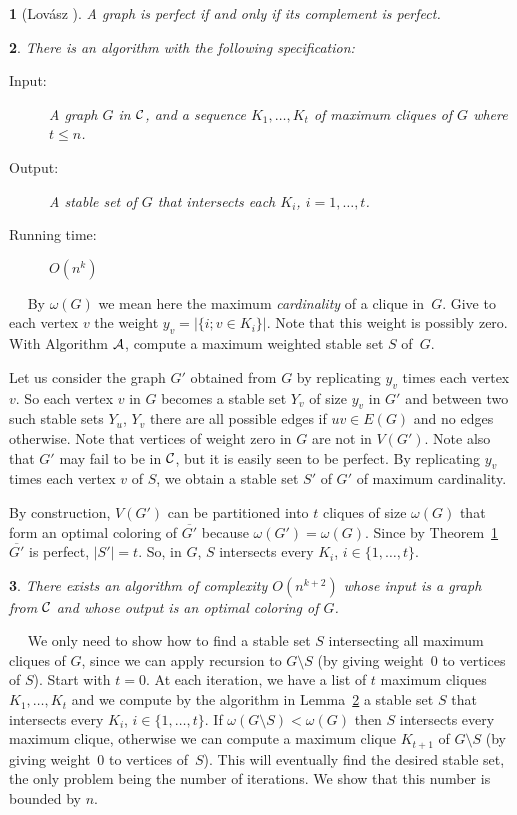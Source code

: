 \documentclass[11 pt] {article}
\newcommand\blackslug{\hbox{\hskip 1pt \vrule width 4pt height 8pt depth 1.5pt
        \hskip 1pt}}
\newcommand\bbox{\hfill \quad \blackslug \medbreak}
\newtheorem{theorem}{}[section]
\newtheorem{lemma}[theorem]{}
\newcounter{claim}
\newcommand{\Proof}{\setcounter{claim}{0}\noindent{\bf Proof.}\ \ }
\begin{document}
\begin{theorem}[Lov\'asz \cite{lovasz:nh}]
  \label{th:lovasz}
  A graph is perfect if and only if its complement is perfect.
\end{theorem}

\begin{lemma}
  \label{l:compS}
  There is an algorithm with the following specification:
  \begin{description}
  \item[Input: ] A graph $G$ in ${\cal C}$, and a sequence
    $K_1, \dots, K_t$ of maximum cliques of $G$ where $t\leq n$.
  \item[Output: ] A stable set of $G$ that intersects each $K_i$,
    $i=1, \dots, t$. 
  \item[Running time: ] ${O}(n^k)$
  \end{description} 
\end{lemma}

\Proof
  By $\omega(G)$ we mean here the maximum \emph{cardinality} of a
  clique in~$G$.  Give to each vertex $v$ the weight $y_v= |\{ i; v
  \in K_i \}|$.  Note that this weight is possibly zero.  With
  Algorithm ${\cal A}$, compute a maximum weighted stable set $S$ of~$G$.

  Let us consider the graph $G'$ obtained from $G$ by replicating
  $y_v$ times each vertex $v$. So each vertex $v$ in $G$ becomes a
  stable set $Y_v$ of size $y_v$ in $G'$ and between two such stable sets
  $Y_u$, $Y_v$ there are all possible edges if $uv\in E(G)$ and
  no edges otherwise. Note that vertices of weight zero in $G$
  are not in $V(G')$. Note also that $G'$ may fail to be in ${\cal C}$,
  but it is easily seen to be perfect.  By replicating $y_v$ times
  each vertex $v$ of $S$, we obtain a stable set $S'$ of $G'$ of
  maximum cardinality.

  By construction, $V(G')$ can be partitioned into $t$ cliques of size
  $\omega (G)$ that form an optimal coloring of $\overline{G'}$
  because $\omega(G') = \omega(G)$.  Since by Theorem~\ref{th:lovasz}
  $\overline{G'}$ is perfect, $|S'|=t$.  So, in $G$, $S$ intersects
  every $K_i$, $i \in \{ 1, \ldots ,t\}$.
\bbox


\begin{theorem}
  \label{th:color}
  There exists an algorithm of complexity $O(n^{k+2})$ whose input is
  a graph from ${\cal C}$ and whose output is an optimal coloring of $G$.
\end{theorem}

\Proof
  We only need to show how to find a stable set $S$ intersecting all
  maximum cliques of $G$, since we can apply recursion to $G \setminus
  S$ (by giving weight~0 to vertices of $S$).  Start with $t=0$. At
  each iteration, we have a list of $t$ maximum cliques $K_1, \ldots,
  K_t$ and we compute by the algorithm in Lemma~\ref{l:compS} a stable
  set $S$ that intersects every $K_i$, $i \in \{ 1, \ldots ,t \}$.  If
  $\omega (G \setminus S) < \omega (G)$ then $S$ intersects every
  maximum clique, otherwise we can compute a maximum clique $K_{t+1}$
  of $G \setminus S$ (by giving weight~0 to vertices of~$S$).  This
  will eventually find the desired stable set, the only problem being the
  number of iterations.  We show that this number is bounded by $n$.
\end{document}
